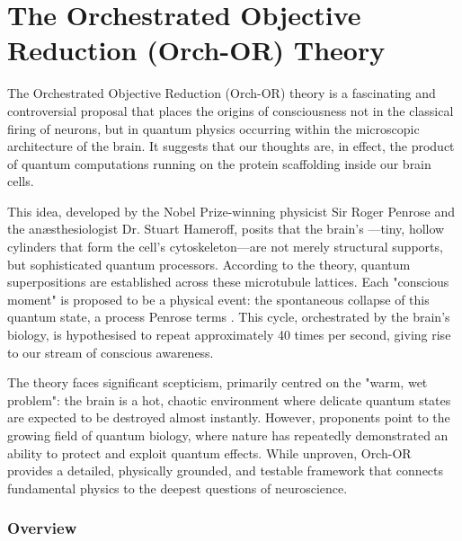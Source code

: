 
\chapter{The Orchestrated Objective Reduction (Orch-OR) Theory}
\label{ch:orch-or}

\begin{nontechnical}
    The Orchestrated Objective Reduction (Orch-OR) theory is a fascinating and controversial proposal that places the origins of consciousness not in the classical firing of neurons, but in quantum physics occurring within the microscopic architecture of the brain. It suggests that our thoughts are, in effect, the product of quantum computations running on the protein scaffolding inside our brain cells.

    This idea, developed by the Nobel Prize-winning physicist Sir Roger Penrose and the anæsthesiologist Dr. Stuart Hameroff, posits that the brain's —tiny, hollow cylinders that form the cell's cytoskeleton—are not merely structural supports, but sophisticated quantum processors. According to the theory, quantum superpositions are established across these microtubule lattices. Each "conscious moment" is proposed to be a physical event: the spontaneous collapse of this quantum state, a process Penrose terms . This cycle, orchestrated by the brain's biology, is hypothesised to repeat approximately 40 times per second, giving rise to our stream of conscious awareness.

    The theory faces significant scepticism, primarily centred on the "warm, wet problem": the brain is a hot, chaotic environment where delicate quantum states are expected to be destroyed almost instantly. However, proponents point to the growing field of quantum biology, where nature has repeatedly demonstrated an ability to protect and exploit quantum effects. While unproven, Orch-OR provides a detailed, physically grounded, and testable framework that connects fundamental physics to the deepest questions of neuroscience.
\end{nontechnical}

\subsection{Overview}

